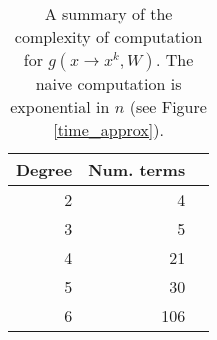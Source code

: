 \begin{table}[t]
\tiny
\centering
\begin{tabular}{rrr}
\hline
Degree & Num. terms \\
\hline
2 & 4   \\
3 & 5   \\
4 & 21  \\
5 & 30  \\
6 & 106 \\
\hline
\end{tabular}
\caption{A summary of the complexity of computation for $g(x \rightarrow x^k, W)$.
  The naive computation is 
  exponential in $n$ (see Figure \ref{time_approx}).} 
\label{eval}
\vspace{-4mm}
\end{table}

